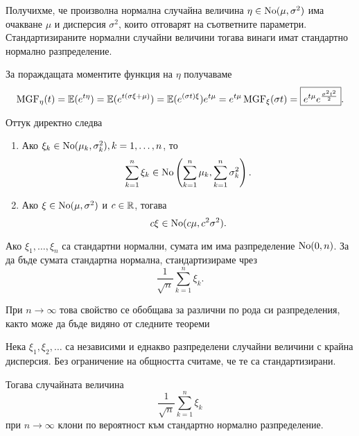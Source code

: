 \documentclass[numbers=endperiod, DIV=15, bibliography=totocnumbered]{scrartcl}
\begin{document}
Получихме, че произволна нормална случайна величина $\eta \in \operatorname{No}(\mu, \sigma^2)$ има очакване $\mu$ и дисперсия $\sigma^2$, които отговарят на съответните параметри. Стандартизираните нормални случайни величини тогава винаги имат стандартно нормално разпределение.

За пораждащата моментите функция на $\eta$ получаваме
\begin{displaymath}
  \operatorname{MGF}_\eta(t)
  =
  \mathbb{E}(e^{t\eta})
  =
  \mathbb{E}(e^{t(\sigma\xi + \mu)})
  =
  \mathbb{E}(e^{(\sigma t) \xi}) e^{t\mu}
  =
  e^{t\mu} \operatorname{MGF}_\xi(\sigma t)
  =
  \boxed{e^{t\mu} e^{\frac {\sigma^2 t^2} 2}}.
\end{displaymath}

Оттук директно следва
\begin{proposition}\label{thm:normal-operations}
  \mbox{}
  \begin{enumerate}
    \item Ако $\xi_k \in \operatorname{No}(\mu_k, \sigma_k^2), k = 1, \ldots, n$, то
    \begin{displaymath}
      \sum_{k=1}^n \xi_k \in \operatorname{No}\left( \sum_{k=1}^n \mu_k, \sum_{k=1}^n \sigma_k^2 \right).
    \end{displaymath}

    \item Ако $\xi \in \operatorname{No}(\mu, \sigma^2)$ и $c \in \mathbb{R}$, тогава
    \begin{displaymath}
      c \xi \in \operatorname{No}(c \mu, c^2 \sigma^2).
    \end{displaymath}
  \end{enumerate}
\end{proposition}

Ако $\xi_1, \ldots, \xi_n$ са стандартни нормални, сумата им има разпределение $\operatorname{No}(0, n)$. За да бъде сумата стандартна нормална, стандартизираме чрез
\begin{displaymath}
  \frac 1 {\sqrt n} \sum_{k=1}^n \xi_k.
\end{displaymath}

При $n \to \infty$ това свойство се обобщава за различни по рода си разпределения, както може да бъде видяно от следните теореми

\begin{theorem}
  Нека $\xi_1, \xi_2, \ldots$ са независими и еднакво разпределени случайни величини с крайна дисперсия. Без ограничение на общността считаме, че те са стандартизирани.

  Тогава случайната величина
  \begin{displaymath}
    \frac 1 {\sqrt n} \sum_{k=1}^n \xi_k
  \end{displaymath}
  при $n \to \infty$ клони по вероятност към стандартно нормално разпределение.
\end{theorem}
\end{document}
